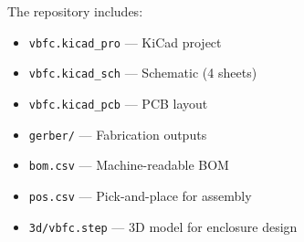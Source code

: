 The repository includes:
\begin{itemize}
    \item \texttt{vbfc.kicad\_pro} --- KiCad project
    \item \texttt{vbfc.kicad\_sch} --- Schematic (4 sheets)
    \item \texttt{vbfc.kicad\_pcb} --- PCB layout
    \item \texttt{gerber/} --- Fabrication outputs
    \item \texttt{bom.csv} --- Machine-readable BOM
    \item \texttt{pos.csv} --- Pick-and-place for assembly
    \item \texttt{3d/vbfc.step} --- 3D model for enclosure design
\end{itemize}